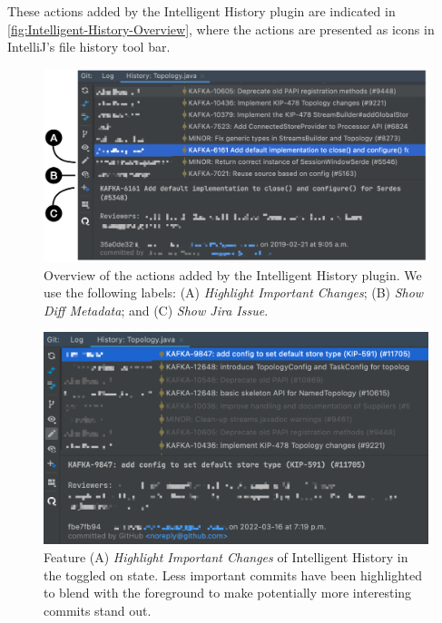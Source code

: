 These actions added by the Intelligent History plugin are indicated in \autoref{fig:Intelligent-History-Overview}, where the actions are presented as icons in IntelliJ's  file history tool bar.

\begin{figure}[h]
    \includegraphics[width=\textwidth]{./images/intelligent-history-overview.png}
    \caption{
        Overview of the actions added by the Intelligent History plugin. We use the following labels: (A) \textit{Highlight Important Changes}; (B) \textit{Show Diff Metadata}; and (C) \textit{Show Jira Issue}.
    }
    \label{fig:Intelligent-History-Overview}
\end{figure}

\begin{figure}[h]
    \includegraphics[width=\textwidth]{./images/intelligent-history-A.png}
    \caption{
        Feature (A) \emph{Highlight Important Changes} of Intelligent History in the toggled on state. Less important commits have been highlighted to blend with the foreground to make potentially more interesting commits stand out.
    }
    \label{fig:Intelligent-History-A}
\end{figure}


